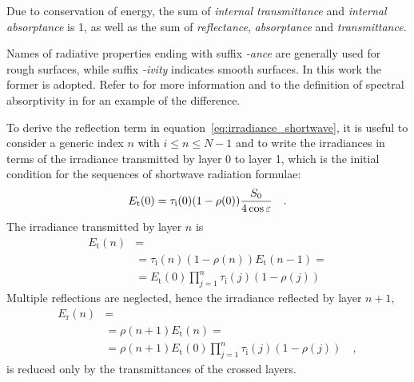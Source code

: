 \documentclass[a4paper,10pt,twocolumn,\classoptions]{article}
\begin{document}
Due to conservation of energy, the sum of \emph{internal transmittance} and \emph{internal absorptance} is 1, as well as the sum of \emph{reflectance}, \emph{absorptance} and \emph{transmittance}.

Names of radiative properties ending with suffix \emph{-ance} are generally used for rough surfaces, while suffix \emph{-ivity} indicates smooth surfaces. In this work the former is adopted. Refer to \cite[20]{Modest} for more information and to the definition of spectral absorptivity in \cite{CIE} for an example of the difference.

To derive the reflection term in equation~\ref{eq:irradiance_shortwave}, it is useful to consider a generic index $n$ with $i \leq n \leq N - 1$ and to write the irradiances in terms of the irradiance transmitted by layer 0 to layer 1, which is the initial condition for the sequences of shortwave radiation formulae:
\begin{equation}
  \label{eq:irradiance_transmitted_0}
  E_\text{t}(0) = \tau_\text{i}(0) (1 - \rho(0)) \frac{S_0}{4 \cos \varepsilon}
  \quad .
\end{equation}
The irradiance transmitted by layer $n$ is
\begin{equation}
  \label{eq:irradiance_transmitted}
  \begin{split}
  E_\text{t}(n) & = \\
  & = \tau_\text{i}(n) (1 - \rho(n)) E_\text{t}(n - 1) = \\
  & = E_\text{t}(0) \prod_{j = 1}^{n} \tau_\text{i}(j) (1 - \rho(j))
  \end{split}
\end{equation}
Multiple reflections are neglected, hence the irradiance reflected by layer $n + 1$,
\begin{equation}
  \label{eq:irradiance_reflected}
  \begin{split}
    E_\text{r}(n) & = \\
    & = \rho(n + 1) E_\text{t}(n) = \\
    & = \rho(n + 1) E_\text{t}(0) \prod_{j = 1}^{n} \tau_\text{i}(j) (1 - \rho(j))
    \quad ,
  \end{split}
\end{equation}
is reduced only by the transmittances of the crossed layers.
\end{document}
